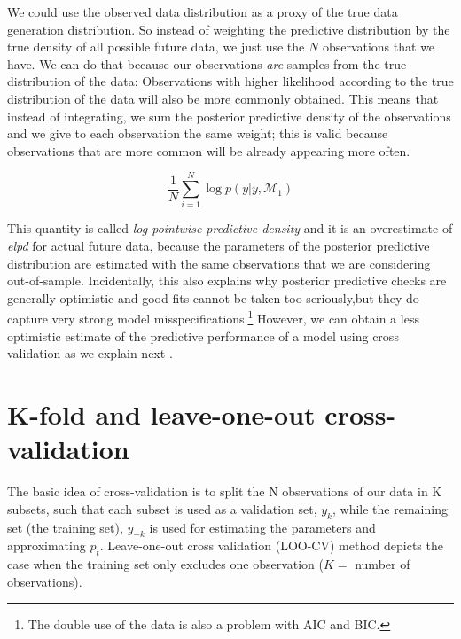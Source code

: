 \documentclass[12pt,]{krantz}
\theoremstyle{definition}
\theoremstyle{definition}
\theoremstyle{definition}
\theoremstyle{remark}
\begin{document}
We could use the observed data distribution as a proxy of the true data
generation distribution. So instead of weighting the predictive
distribution by the true density of all possible future data, we just
use the \(N\) observations that we have. We can do that because our
observations \emph{are} samples from the true distribution of the data:
Observations with higher likelihood according to the true distribution
of the data will also be more commonly obtained. This means that instead
of integrating, we sum the posterior predictive density of the
observations and we give to each observation the same weight; this is
valid because observations that are more common will be already
appearing more often.

\begin{equation}
\frac{1}{N} \sum_{i=1}^{N} \log p(y|y, \mathcal{M}_1) 
\end{equation}

This quantity is called \emph{log pointwise predictive density}
\citep[without the \(1/N\) in][]{vehtariPracticalBayesianModel2017} and
it is an overestimate of \emph{elpd} for actual future data, because the
parameters of the posterior predictive distribution are estimated with
the same observations that we are considering out-of-sample.
Incidentally, this also explains why posterior predictive checks are
generally optimistic and good fits cannot be taken too seriously,but
they do capture very strong model misspecifications.\footnote{The double
  use of the data is also a problem with AIC and BIC.} However, we can
obtain a less optimistic estimate of the predictive performance of a
model using cross validation \citep{GeisserEddy1979} as we explain next
\citep[there are, however, also other alternatives to cross validation
presented in][]{VehtariOjanen2012}.

\section{K-fold and leave-one-out
cross-validation}\label{k-fold-and-leave-one-out-cross-validation}

The basic idea of cross-validation is to split the N observations of our
data in K subsets, such that each subset is used as a validation set,
\(y_k\), while the remaining set (the training set), \(y_{-k}\) is used
for estimating the parameters and approximating \(p_t\). Leave-one-out
cross validation (LOO-CV) method depicts the case when the training set
only excludes one observation (\(K =\) number of observations).
\end{document}
